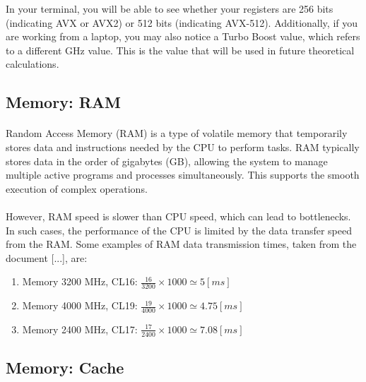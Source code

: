     In your terminal, you will be able to see whether your registers are 256 bits (indicating AVX or AVX2) or 512 bits 
    (indicating AVX-512). Additionally, if you are working from a laptop, you may also notice a Turbo Boost value, which 
    refers to a different GHz value. This is the value that will be used in future theoretical calculations.

    

    \subsection{Memory: RAM}

    \paragraph*{}
    Random Access Memory (RAM) is a type of volatile memory that temporarily stores data and instructions needed 
    by the CPU to perform tasks. RAM typically stores data in the order of gigabytes (GB), allowing the system 
    to manage multiple active programs and processes simultaneously. This supports the smooth execution of complex 
    operations.
    \par

    \paragraph*{}
    However, RAM speed is slower than CPU speed, which can lead to bottlenecks. In such cases, the performance of 
    the CPU is limited by the data transfer speed from the RAM. Some examples of RAM data transmission times, 
    taken from the document [...], are:
    \begin{enumerate}
        \item Memory 3200 MHz, CL16: $\frac{16}{3200} \times 1000 \simeq 5 [ms]$
        \item Memory 4000 MHz, CL19: $\frac{19}{4000} \times 1000 \simeq 4.75 [ms]$
        \item  Memory 2400 MHz, CL17: $\frac{17}{2400} \times 1000 \simeq 7.08 [ms]$
    \end{enumerate}
    
    
   
\subsection{Memory: Cache}

